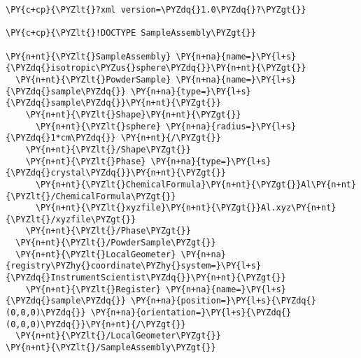 \begin{Verbatim}[commandchars=\\\{\},fontsize=\tiny]
\PY{c+cp}{\PYZlt{}?xml version=\PYZdq{}1.0\PYZdq{}?\PYZgt{}}

\PY{c+cp}{\PYZlt{}!DOCTYPE SampleAssembly\PYZgt{}}

\PY{n+nt}{\PYZlt{}SampleAssembly} \PY{n+na}{name=}\PY{l+s}{\PYZdq{}isotropic\PYZus{}sphere\PYZdq{}}\PY{n+nt}{\PYZgt{}}
  \PY{n+nt}{\PYZlt{}PowderSample} \PY{n+na}{name=}\PY{l+s}{\PYZdq{}sample\PYZdq{}} \PY{n+na}{type=}\PY{l+s}{\PYZdq{}sample\PYZdq{}}\PY{n+nt}{\PYZgt{}}
    \PY{n+nt}{\PYZlt{}Shape}\PY{n+nt}{\PYZgt{}}
      \PY{n+nt}{\PYZlt{}sphere} \PY{n+na}{radius=}\PY{l+s}{\PYZdq{}1*cm\PYZdq{}} \PY{n+nt}{/\PYZgt{}}
    \PY{n+nt}{\PYZlt{}/Shape\PYZgt{}}
    \PY{n+nt}{\PYZlt{}Phase} \PY{n+na}{type=}\PY{l+s}{\PYZdq{}crystal\PYZdq{}}\PY{n+nt}{\PYZgt{}}
      \PY{n+nt}{\PYZlt{}ChemicalFormula}\PY{n+nt}{\PYZgt{}}Al\PY{n+nt}{\PYZlt{}/ChemicalFormula\PYZgt{}}
      \PY{n+nt}{\PYZlt{}xyzfile}\PY{n+nt}{\PYZgt{}}Al.xyz\PY{n+nt}{\PYZlt{}/xyzfile\PYZgt{}}
    \PY{n+nt}{\PYZlt{}/Phase\PYZgt{}}
  \PY{n+nt}{\PYZlt{}/PowderSample\PYZgt{}}
  \PY{n+nt}{\PYZlt{}LocalGeometer} \PY{n+na}{registry\PYZhy{}coordinate\PYZhy{}system=}\PY{l+s}{\PYZdq{}InstrumentScientist\PYZdq{}}\PY{n+nt}{\PYZgt{}}
    \PY{n+nt}{\PYZlt{}Register} \PY{n+na}{name=}\PY{l+s}{\PYZdq{}sample\PYZdq{}} \PY{n+na}{position=}\PY{l+s}{\PYZdq{}(0,0,0)\PYZdq{}} \PY{n+na}{orientation=}\PY{l+s}{\PYZdq{}(0,0,0)\PYZdq{}}\PY{n+nt}{/\PYZgt{}}
  \PY{n+nt}{\PYZlt{}/LocalGeometer\PYZgt{}}
\PY{n+nt}{\PYZlt{}/SampleAssembly\PYZgt{}}
\end{Verbatim}
